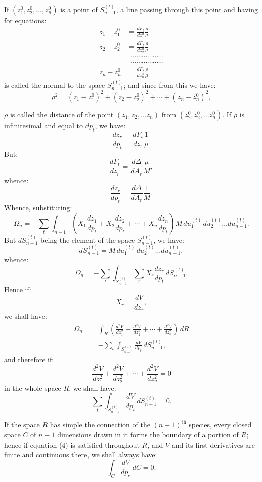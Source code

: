 \documentclass{article}
\begin{document}
If $(z_{1}^{0}, z_{2}^{0},\ldots, z_{n}^{0})$ is a point of $S^{(t)}_{n-1}$, a line passing through this point and having for equations:
\[ \begin{aligned} z_{1} - z_{1}^{0} &= \frac{dF_{t}}{dz_{1}^{0}}\frac{\rho}{\mu} \\ z_{2} - z_{2}^{0} &= \frac{dF_{t}}{dz_{2}^{0}}\frac{\rho}{\mu} \\ &\;\;\cdots\cdots\cdots\cdots\cdots\cdots\\ &\;\;\cdots\cdots\cdots\cdots\cdots\cdots\\ z_{n} - z_{n}^{0} &= \frac{dF_{t}}{dz_{n}^{0}}\frac{\rho}{\mu} \end{aligned} \]
is called the normal to the space $S^{(t)}_{n-1}$; and since from this we have:
\[ \rho^{2} = (z_{1} - z_{1}^{0})^{2} + (z_{2} - z_{2}^{0})^{2} + \cdots + (z_{n} - z_{n}^{0})^{2}, \]

$\rho$ is called the distance of the point $(z_{1}, z_{2},\ldots z_{n})$ from $(z_{2}^{0}, z_{2}^{0},\ldots z_{n}^{0})$. If $\rho$ is infinitesimal and equal to $dp_{t}$, we have:
\[ \frac{dz_{r}}{dp_{t}} = \frac{dF_{t}}{dz_{r}}\frac{1}{\mu}. \]
But:
\[ \frac{dF_{t}}{dz_{r}} = \frac{d\Delta}{dA_{r}}\frac{\mu}{M}, \]
whence:
\[ \frac{dz_{r}}{dp_{t}} = \frac{d\Delta}{dA_{r}}\frac{1}{M}. \]
Whence, substituting:
\[ \Omega_{n} = - \sum_{t} \int_{n-1} \left( X_{1} \frac{dz_{1}}{dp_{t}} + X_{2} \frac{dz_{2}}{dp_{t}} + \cdots + X_{n} \frac{dz_{n}}{dp_{t}} \right) M\,du^{(t)}_{1}\,du^{(t)}_{2}\ldots du^{(t)}_{n-1}. \]
But $dS^{(t)}_{n-1}$ being the element of the space $S^{(t)}_{n-1}$, we have:
\[ dS^{(t)}_{n-1} = M\,du^{(t)}_{1}\,du^{(t)}_{2}\ldots du^{(t)}_{n-1}, \]
whence:
\[ \Omega_{n} = - \sum_{t} \int_{S^{(t)}_{n-1}} \sum_{r} X_{r} \frac{dz_{r}}{dp_{t}}\,dS^{(t)}_{n-1}. \]
Hence if:
\[ X_{r} = \frac{dV}{dz_{r}}, \]
we shall have:
\[ \begin{aligned} \Omega_{n} &= \int_{R} \left( \frac{d^{2}V}{dz_{1}^{2}} + \frac{d^{2}V}{dz_{2}^{2}} + \cdots + \frac{d^{2}V}{dz_{n}^{2}} \right)\,dR \\ &= - \sum_{t} \int_{S^{(t)}_{n-1}} \frac{dV}{dp_{t}}\,dS^{(t)}_{n-1}, \end{aligned} \]
and therefore if:
\[ \frac{d^{2}V}{dz_{1}^{2}} + \frac{d^{2}V}{dz_{2}^{2}} + \cdots + \frac{d^{2}V}{dz_{n}^{2}} = 0 \tag{4} \]
in the whole space $R$, we shall have:
\[ \sum_{t} \int_{S^{(t)}_{n-1}} \frac{dV}{dp_{t}}\,dS^{(t)}_{n-1} = 0. \tag{5} \]


If the space $R$ has simple the connection of the $(n-1)^{\text{th}}$ species, every closed space $C$ of $n-1$ dimensions drawn in it forms the boundary of a portion of $R$; hence if equation (4) is satisfied throughout $R$, and $V$ and its first derivatives are finite and continuous there, we shall always have:
\[ \int_{C} \frac{dV}{dp_{c}}\,dC = 0. \]
\end{document}
